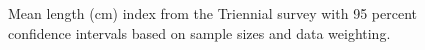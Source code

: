 \documentclass[
]{scrartcl}
\begin{document}
\begin{figure}[H]


\caption{\label{fig-meanlt-tri}Mean length (cm) index from the Triennial
survey with 95 percent confidence intervals based on sample sizes and
data weighting.}

\end{figure}%
\end{document}
